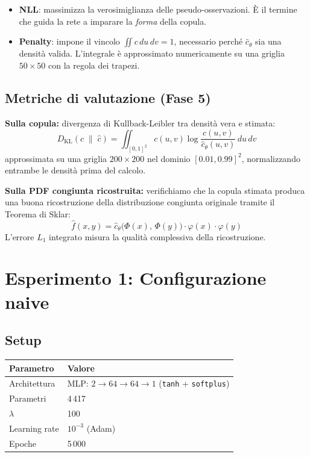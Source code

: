 \documentclass[11pt, a4paper]{article}
\begin{document}
\begin{itemize}
    \item \textbf{NLL}: massimizza la verosimiglianza delle pseudo-osservazioni. È il termine che guida la rete a imparare la \emph{forma} della copula.
    \item \textbf{Penalty}: impone il vincolo $\iint c\,du\,dv = 1$, necessario perché $\hat{c}_\theta$ sia una densità valida. L'integrale è approssimato numericamente su una griglia $50 \times 50$ con la regola dei trapezi.
\end{itemize}

\subsection{Metriche di valutazione (Fase 5)}

\textbf{Sulla copula:} divergenza di Kullback-Leibler tra densità vera e stimata:
\[
D_{\mathrm{KL}}(c \;\|\; \hat{c}) = \iint_{[0,1]^2} c(u,v) \log\frac{c(u,v)}{\hat{c}_\theta(u,v)}\,du\,dv
\]
approssimata su una griglia $200 \times 200$ nel dominio $[0.01,0.99]^2$, normalizzando entrambe le densità prima del calcolo.

\textbf{Sulla PDF congiunta ricostruita:} verifichiamo che la copula stimata produca una buona ricostruzione della distribuzione congiunta originale tramite il Teorema di Sklar:
\[
\hat{f}(x,y) = \hat{c}_\theta\bigl(\Phi(x),\, \Phi(y)\bigr) \cdot \varphi(x) \cdot \varphi(y)
\]
L'errore $L_1$ integrato misura la qualità complessiva della ricostruzione.

\section{Esperimento 1: Configurazione naive}

\subsection{Setup}

\begin{center}
\begin{tabular}{ll}
\toprule
\textbf{Parametro} & \textbf{Valore} \\
\midrule
Architettura & MLP: $2 \to 64 \to 64 \to 1$ (\texttt{tanh} + \texttt{softplus}) \\
Parametri & 4\,417 \\
$\lambda$ & 100 \\
Learning rate & $10^{-3}$ (Adam) \\
Epoche & 5\,000 \\
\bottomrule
\end{tabular}
\end{center}
\end{document}
